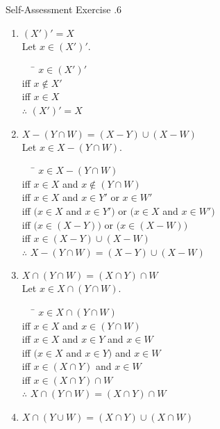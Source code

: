\documentclass[../notes.tex]{subfiles}
\begin{document}
			\begin{exercise}{Self-Assessment Exercise \thechapter.6}
				\begin{enumerate}[label=(\alph*)]
					\item $(X')' = X$\\
						Let $x \in (X')'$.
						\begin{tabbing}
							$\quad$ \= $x \in (X')'$\\
							iff \> $x \notin X'$\\
							iff \> $x \in X$\\
							$\therefore$ \> $(X')' = X$
						\end{tabbing}
					\item $X - (Y \cap W) = (X - Y) \cup (X - W)$\\
						Let $x \in X - (Y \cap W)$.
						\begin{tabbing}
							$\quad$ \= $x \in X - (Y \cap W)$\\
							iff \> $x \in X$ and $x \notin (Y \cap W)$\\
							iff \> $x \in X$ and $x \in Y'$ or $x \in W'$\\
							iff \> $\bigl(x \in X$ and $x \in Y'\bigr)$ or $\bigl(x \in X$ and $x \in W'\bigr)$\\
							iff \> $\bigl(x \in (X - Y)\bigr)$ or $\bigl(x \in (X - W)\bigr)$\\
							iff \> $x \in (X - Y) \cup (X - W)$\\
							$\therefore$ \> $X - (Y \cap W) = (X - Y) \cup (X - W)$
						\end{tabbing}
					\item $X \cap (Y \cap W) = (X \cap Y) \cap W$\\
						Let $x \in X \cap (Y \cap W)$.
						\begin{tabbing}
							$\quad$ \= $x \in X \cap (Y \cap W)$\\
							iff \> $x \in X$ and $x \in (Y \cap W)$\\
							iff \> $x \in X$ and $x \in Y$ and $x \in W$\\
							iff \> $(x \in X$ and $x \in Y)$ and $x \in W$\\
							iff \> $x \in (X \cap Y)$ and $x \in W$\\
							iff \> $x \in (X \cap Y) \cap W$\\
							$\therefore$ \> $X \cap (Y \cap W) = (X \cap Y) \cap W$
						\end{tabbing}
					\item $X \cap (Y \cup W) = (X \cap Y) \cup (X \cap W)$\\

\end{enumerate}
\end{exercise}
\end{document}
